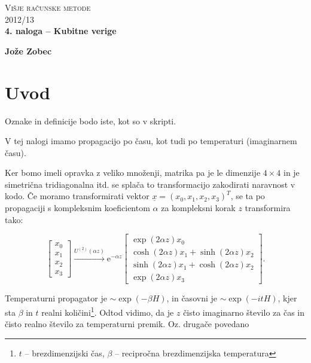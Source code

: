 \documentclass[a4 paper, 12pt]{article}
\begin{document}
\begin{center}
\textsc{Višje računske metode}\\
\textsc{2012/13}\\[0.5cm]
\textbf{4. naloga -- Kubitne verige}
\end{center}
\begin{flushright}
\textbf{Jože Zobec}
\end{flushright}

\newcommand{\e}{
	\ensuremath{\text{e}}
}

\section{Uvod}

Oznake in definicije bodo iste, kot so v skripti.

V tej nalogi imamo propagacijo po času, kot tudi po temperaturi (imaginarnem času).

Ker bomo imeli opravka z veliko množenji, matrika pa je le dimenzije $4 \times 4$ in je simetrična tridiagonalna
itd. se splača to transformacijo zakodirati naravnost v kodo. Če moramo transformirati vektor
$\underline{x} = (x_0, x_1, x_2, x_3)^T$, se ta po propagaciji s kompleksnim koeficientom $\alpha$ za kompleksni korak
$z$ transformira tako:

\begin{equation}
	\begin{bmatrix}
		x_0 \\
		x_1 \\
		x_2 \\
		x_3
	\end{bmatrix} \stackrel{U^{(2)}(\alpha z)}{\longrightarrow} \text{e}^{-\alpha z}
	\begin{bmatrix}
		\exp(2\alpha z) x_0 \\
		\cosh(2\alpha z)x_1 + \sinh(2\alpha z)x_2 \\
		\sinh(2\alpha z)x_1 + \cosh(2\alpha z)x_2 \\
		\exp(2\alpha z) x_3
	\end{bmatrix}.
	\label{eqn:U}
\end{equation}

Temperaturni propagator je $\sim \exp(-\beta H)$, in časovni je $\sim \exp (-itH)$, kjer sta $\beta$ in $t$ realni
količini\footnote{$t$ -- brezdimenzijski čas, $\beta$ -- recipročna brezdimenzijska temperatura}. Odtod vidimo, da
je $z$ čisto imaginarno število za čas in čisto realno število za temperaturni premik. Oz. drugače povedano
\end{document}
